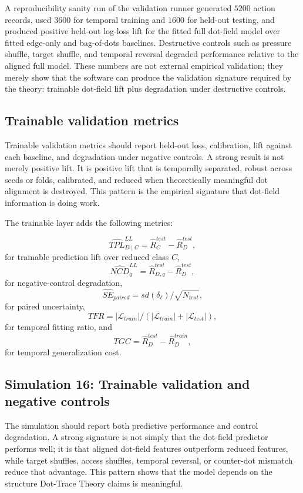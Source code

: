 \documentclass[11pt]{article}
\theoremstyle{remark}
\begin{document}
A reproducibility sanity run of the validation runner generated $5200$ action
records, used $3600$ for temporal training and $1600$ for held-out testing, and
produced positive held-out log-loss lift for the fitted full dot-field model over
fitted edge-only and bag-of-dots baselines. Destructive controls such as pressure
shuffle, target shuffle, and temporal reversal degraded performance relative to
the aligned full model. These numbers are not external empirical validation;
they merely show that the software can produce the validation signature required
by the theory: trainable dot-field lift plus degradation under destructive
controls.

\subsection{Trainable validation metrics}\label{trainable-validation-metrics}

Trainable validation metrics should report held-out loss, calibration, lift against each baseline, and degradation under negative controls. A strong result is not merely positive lift. It is positive lift that is temporally separated, robust across seeds or folds, calibrated, and reduced when theoretically meaningful dot alignment is destroyed. This pattern is the empirical signature that dot-field information is doing work.


The trainable layer adds the following metrics:

\[
\widehat{TPL}_{D\mid C}^{LL}=\widehat R_C^{test}-\widehat R_D^{test},
\]
for trainable prediction lift over reduced class $C$,
\[
\widehat{NCD}_{q}^{LL}=\widehat R_{D,q}^{test}-\widehat R_D^{test},
\]
for negative-control degradation,
\[
\widehat{SE}_{paired}=sd(\delta_\ell)/\sqrt{N_{test}},
\]
for paired uncertainty,
\[
TFR=|\mathcal L_{train}|/(|\mathcal L_{train}|+|\mathcal L_{test}|),
\]
for temporal fitting ratio, and
\[
TGC=\widehat R_D^{test}-\widehat R_D^{train},
\]
for temporal generalization cost.

\subsection{Simulation 16: Trainable validation and negative controls}\label{simulation-16-trainable-validation-negative-controls}

The simulation should report both predictive performance and control degradation. A strong signature is not simply that the dot-field predictor performs well; it is that aligned dot-field features outperform reduced features, while target shuffles, access shuffles, temporal reversal, or counter-dot mismatch reduce that advantage. This pattern shows that the model depends on the structure Dot-Trace Theory claims is meaningful.
\end{document}

